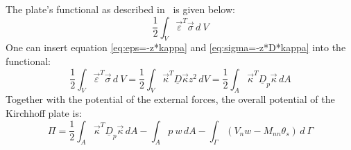   The plate's functional as described in~\cite{steinke2005finite} is given below:
  \begin{equation}
  \frac{1}{2} \int_V \vec{\varepsilon}^T \vec{\sigma}\, d\:\!V
  \end{equation}
  One can insert equation \eqref{eq:eps=-z*kappa} and \eqref{eq:sigma=-z*D*kappa} into the functional:
  \begin{equation}
  \frac{1}{2} \int_V \vec{\varepsilon}^T \vec{\sigma}\, d\:\!V = \frac{1}{2}\int_V \vec{\kappa}^T \underline{D} \vec{\kappa} z^2\, d\!V = \frac{1}{2} \int_A \vec{\kappa}^T \underline{D}_p \vec{\kappa}\, d\!A
  \end{equation}
  Together with the potential of the external forces, the overall potential of the Kirchhoff plate is:
  \begin{equation}\label{eq:plateFunctional}
  \Pi = \frac{1}{2}\int_A \vec{\kappa}^T \underline{D}_p \vec{\kappa}\, dA
  - \int_A p\ w\, d\!A
  - \int_{\Gamma}\left(V_n w - M_{nn} \theta_s\right)\,d\:\!\Gamma
  \end{equation}
  
